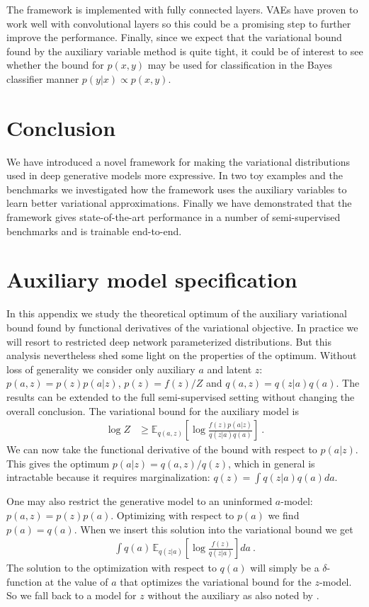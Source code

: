 \documentclass{article}
\begin{document}
The framework is implemented with fully connected layers. VAEs have proven to work well with convolutional layers so this could be a promising step to further improve the performance. Finally, since we expect that the variational bound found by the auxiliary variable method is quite tight, it could be of interest to see whether the bound for $p(x,y)$ may be used for classification in the Bayes classifier manner $p(y|x) \propto p(x,y)$.
\vspace{-2mm}
\section{Conclusion}
We have introduced a novel framework for making the variational distributions used in deep generative models more expressive. In two toy examples and the benchmarks we investigated how the framework uses the auxiliary variables to learn better variational approximations. Finally we have demonstrated that the framework gives state-of-the-art performance in a number of semi-supervised benchmarks and is trainable end-to-end. 

\appendix 
\section{Auxiliary model specification} \label{app:auxiliary_variable}

In this appendix we study the theoretical optimum of the auxiliary variational bound found by functional derivatives of the variational objective. In practice we will resort to restricted deep network parameterized distributions. But this analysis nevertheless shed some light on the properties of the optimum. Without loss of generality we consider only auxiliary $a$ and latent $z$: $p(a,z)=p(z)p(a|z)$, $p(z)=f(z)/Z$ and $q(a,z)=q(z|a)q(a)$. The results can be extended to the full semi-supervised setting without changing the overall conclusion. The variational bound for the auxiliary model is
\begin{align}
\log Z & \ge \mathbb{E}_{q(a,z)} \left [ \log \frac{f(z)p(a|z)}{q(z|a)q(a)} \right ] \ . 
\end{align}
We can now take the functional derivative of the bound with respect to $p(a|z)$. This gives the optimum $p(a|z)=q(a,z)/q(z)$, which in general is intractable because it requires marginalization: $q(z)=\int q(z|a)q(a) da$. 

One may also restrict the generative model to an uninformed $a$-model: $p(a,z)=p(z)p(a)$. Optimizing with respect to $p(a)$ we find $p(a)=q(a)$. When we insert this solution into the variational bound we get
\begin{align}
\int q(a) \, \mathbb{E}_{q(z|a)} \left [ \log \frac{f(z)}{q(z|a)} \right ] da \ .
\end{align}
The solution to the optimization with respect to $q(a)$ will simply be a $\delta$-function at the value of $a$ that optimizes the variational bound for the $z$-model. So we fall back to a model for $z$ without the auxiliary as also noted by \citet{Agakov04}. 
\end{document}
